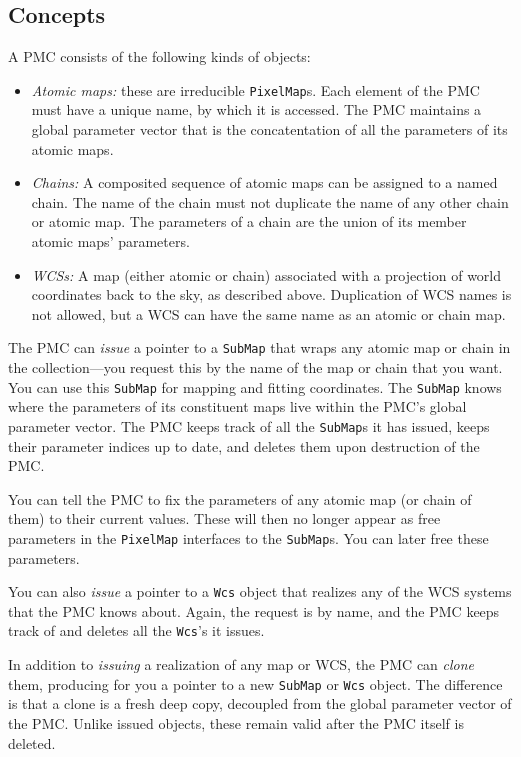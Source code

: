 \documentclass[11pt,preprint,flushrt]{aastex}
\begin{document}
\subsection{Concepts}
A PMC consists of the following kinds of objects:
\begin{itemize}
\item {\it Atomic maps:} these are irreducible {\tt PixelMap}s.  Each element of the PMC must have a unique name, by which it is accessed.  The PMC maintains a global parameter vector that is the concatentation of all the parameters of its atomic maps.
\item {\it Chains:} A composited sequence of atomic maps can be assigned to a named chain.  The name of the chain must not duplicate the name of any other chain or atomic map.  The parameters of a chain are the union of its member atomic maps' parameters.
\item {\it WCSs:} A map (either atomic or chain) associated with a projection of world coordinates back to the sky, as described above.  Duplication of WCS names is not allowed, but a WCS can have the same name as an atomic or chain map.
\end{itemize}

The PMC can {\em issue} a pointer to a {\tt SubMap} that wraps any atomic map or chain in the collection---you request this by the name of the map or chain that you want.  You can use this {\tt SubMap} for mapping and fitting coordinates.  The {\tt SubMap} knows where the parameters of its constituent maps live within the PMC's global parameter vector.  The PMC keeps track of all the {\tt SubMap}s it has issued, keeps their parameter indices up to date, and deletes them upon destruction of the PMC.

You can tell the PMC to fix the parameters of any atomic map (or chain of them) to their current values.  These will then no longer appear as free parameters in the {\tt PixelMap} interfaces to the {\tt SubMap}s.  You can later free these parameters.

You can also {\em issue} a pointer to a {\tt Wcs} object that realizes any of the WCS systems that the PMC knows about.  Again, the request is by name, and the PMC keeps track of and deletes all the {\tt Wcs}'s it issues.

In addition to {\em issuing} a realization of any map or WCS, the PMC can {\em clone} them, producing for you a pointer to a new {\tt SubMap} or {\tt Wcs} object.  The difference is that a clone is a fresh deep copy, decoupled from the global parameter vector of the PMC.  Unlike issued objects, these remain valid after the PMC itself is deleted.
\end{document}

